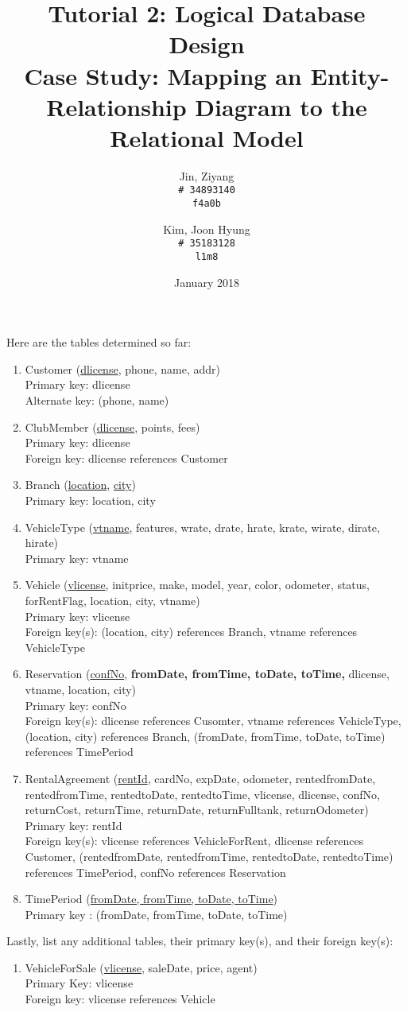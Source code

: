 \documentclass{article}
\title{%
	Tutorial 2: Logical Database Design \\
	\large Case Study: Mapping an Entity-Relationship Diagram to the Relational Model}
\author{
	Jin, Ziyang\\
	\texttt{\# 34893140}\\
	\texttt{f4a0b}
	\and
	Kim, Joon Hyung\\
	\texttt{\# 35183128}\\
	\texttt{l1m8}
}
\date{January 2018}
\begin{document}
	\maketitle
	Here are the tables determined so far:
	\begin{enumerate}
		\item Customer (\underline{dlicense}, phone, name, addr) \\ 
			Primary key: dlicense \\ 
			Alternate key: (phone, name)

		\item ClubMember (\underline{dlicense}, points, fees)\\
			Primary key: dlicense \\
			Foreign key: dlicense references Customer

		\item Branch (\underline{location}, \underline{city}) \\
			Primary key: location, city

		\item VehicleType (\underline{vtname}, features, wrate, drate, hrate, krate, wirate, dirate, hirate) \\
			Primary key: vtname

		\item Vehicle (\underline{vlicense}, initprice, make, model, year, color, odometer, status, forRentFlag, location, city, vtname) \\
			Primary key: vlicense \\
			Foreign key(s): (location, city) references Branch, vtname references VehicleType

		\item Reservation (\underline{confNo}, \textbf{fromDate, fromTime, toDate, toTime,} dlicense, vtname, location, city)\\
			Primary key: confNo \\
			Foreign key(s): dlicense references Cusomter, vtname references VehicleType, (location, city) references Branch, (fromDate, fromTime, toDate, toTime) references TimePeriod

		\item RentalAgreement (\underline{rentId}, cardNo, expDate, odometer, rentedfromDate, rentedfromTime,
			rentedtoDate, rentedtoTime, vlicense, dlicense, confNo, returnCost, returnTime, returnDate, returnFulltank, returnOdometer) \\
			Primary key: rentId \\
			Foreign key(s): vlicense references VehicleForRent, dlicense references Customer, (rentedfromDate, rentedfromTime, rentedtoDate, rentedtoTime) references TimePeriod, confNo references Reservation

		\item TimePeriod (\underline{fromDate, fromTime, toDate, toTime}) \\
			Primary key : (fromDate, fromTime, toDate, toTime)

	\end{enumerate}
	Lastly, list any additional tables, their primary key(s), and their foreign key(s):
	\begin{enumerate}
		\item VehicleForSale (\underline{vlicense}, saleDate, price, agent) \\
			Primary Key: vlicense \\
			Foreign key: vlicense references Vehicle
	\end{enumerate}
	
\end{document}

